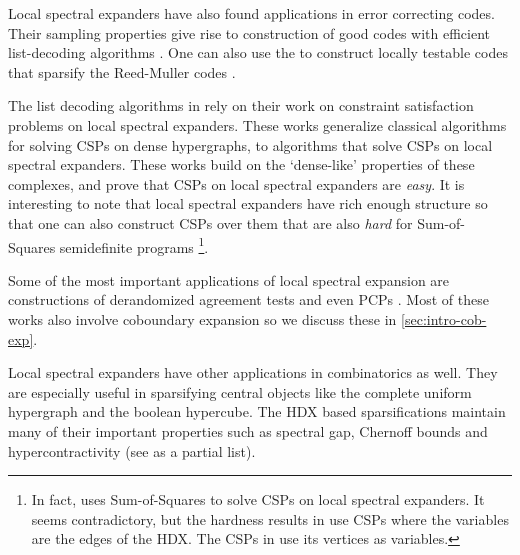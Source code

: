 \documentclass[10pt,a4paper]{article}
\newcommand{\prettyref}[1]{\cref{#1}}
\theoremstyle{definition}
\theoremstyle{remark}
\numberwithin{equation}{section}
\let\pref=\prettyref
\begin{document}
Local spectral expanders have also found applications in error correcting codes. Their sampling properties give rise to construction of good codes with efficient list-decoding algorithms \cite{AlevJT2019,DinurHKLT2021,jeronimo2021near}. One can also use the to construct locally testable codes that sparsify the Reed-Muller codes \cite{DinurLZ2023}.

The list decoding algorithms in \cite{AlevJT2019,jeronimo2021near} rely on their work on constraint satisfaction problems on local spectral expanders. These works generalize classical algorithms for solving CSPs on dense hypergraphs, to algorithms that solve CSPs on local spectral expanders. These works build on the `dense-like' properties of these complexes, and prove that CSPs on local spectral expanders are \emph{easy}. It is interesting to note that local spectral expanders have rich enough structure so that one can also construct CSPs over them that are also \emph{hard} for Sum-of-Squares semidefinite programs \cite{DinurFHT2020,HopkinsL2022}\footnote{In fact, \cite{AlevJT2019} uses Sum-of-Squares to solve CSPs on local spectral expanders. It seems contradictory, but the hardness results in \cite{DinurFHT2020,HopkinsL2022} use CSPs where the variables are the edges of the HDX. The CSPs in \cite{AlevJT2019} use its vertices as variables.}.

Some of the most important applications of local spectral expansion are constructions of derandomized agreement tests \cite{DinurK2017,DiksteinD2019,GotlibK2022,BafnaM2024,DiksteinDL2024} and even PCPs \cite{bafna2024quasi}. Most of these works also involve coboundary expansion so we discuss these in \pref{sec:intro-cob-exp}. 

Local spectral expanders have other applications in combinatorics as well. They are especially useful in sparsifying central objects like the complete uniform hypergraph and the boolean hypercube. The HDX based sparsifications maintain many of their important properties such as spectral gap, Chernoff bounds and hypercontractivity (see \cite{KaufmanM2017,DiksteinDFH2018,kaufman2020high,GurLL2022,BafnaHKL2022,dikstein2024chernoff} as a partial list).
\end{document}
